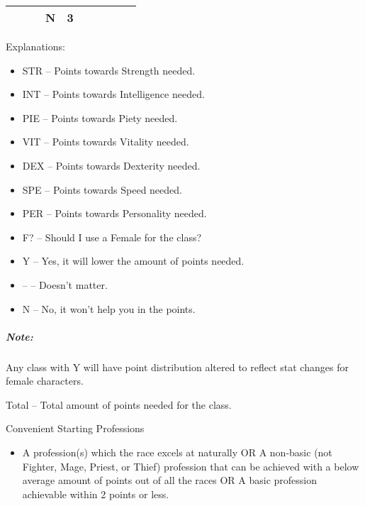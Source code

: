 \documentclass[12pt]{article}
\providecommand{\tightlist}{%
  \setlength{\itemsep}{0pt}\setlength{\parskip}{0pt}}
\let\oldsubparagraph\subparagraph
\renewcommand{\subparagraph}[1]{\oldsubparagraph{#1}\mbox{}}
\begin{document}
\begin{longtable}[]{@{}|l|c|c|c|c|c|c|c|c|r|@{}}
\begin{minipage}[t]{0.06\columnwidth}
\strut\end{minipage} &
\begin{minipage}[t]{0.06\columnwidth}\raggedright\strut
\strut\end{minipage} &
\begin{minipage}[t]{0.06\columnwidth}\raggedright\strut
\strut\end{minipage} &
\begin{minipage}[t]{0.07\columnwidth}\raggedright\strut
N
\strut\end{minipage} &
\begin{minipage}[t]{0.08\columnwidth}\raggedright\strut
3
\strut\end{minipage}\tabularnewline
\bottomrule
\end{longtable}

Explanations:

\begin{itemize}
\tightlist
\item
  STR -- Points towards Strength needed.
\item
  INT -- Points towards Intelligence needed.
\item
  PIE -- Points towards Piety needed.
\item
  VIT -- Points towards Vitality needed.
\item
  DEX -- Points towards Dexterity needed.
\item
  SPE -- Points towards Speed needed.
\item
  PER -- Points towards Personality needed.
\item
  F? -- Should I use a Female for the class?
\item
  Y -- Yes, it will lower the amount of points needed.
\item
  -- -- Doesn't matter.
\item
  N -- No, it won't help you in the points.
\end{itemize}

\subparagraph{Note:} Any class with Y will have point distribution altered to
reflect stat changes for female characters.

Total -- Total amount of points needed for the class.

Convenient Starting Professions

\begin{itemize}
\tightlist
\item
  A profession(s) which the race excels at naturally OR A non-basic (not
  Fighter, Mage, Priest, or Thief) profession that can be achieved with
  a below average amount of points out of all the races OR A basic
  profession achievable within 2 points or less.
\end{itemize}
\end{document}
